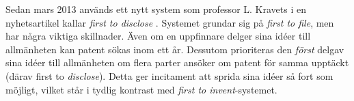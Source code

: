 Sedan mars 2013 används ett nytt system som professor L. Kravets i en nyhetsartikel kallar \emph{first to disclose} \cite{kravets}. Systemet grundar sig på \emph{first to file}, men har några viktiga skillnader. Även om en uppfinnare delger sina idéer till allmänheten kan patent sökas inom ett år. Dessutom prioriteras den \emph{först} delgav sina idéer till allmänheten om flera parter ansöker om patent för samma upptäckt (därav first to \emph{disclose}). Detta ger incitament att sprida sina idéer så fort som möjligt, vilket står i tydlig kontrast med \emph{first to invent}-systemet.


%

